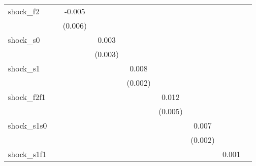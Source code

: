 {\begin{tabular}{l*{8}{c}}
\addlinespace
shock\_f2    &                     &      -0.005         &                     &                     &                     &                     &                     &                     \\
            &                     &     (0.006)         &                     &                     &                     &                     &                     &                     \\
\addlinespace
shock\_s0    &                     &                     &       0.003         &                     &                     &                     &                     &                     \\
            &                     &                     &     (0.003)         &                     &                     &                     &                     &                     \\
\addlinespace
shock\_s1    &                     &                     &                     &       0.008\sym{***}&                     &                     &                     &                     \\
            &                     &                     &                     &     (0.002)         &                     &                     &                     &                     \\
\addlinespace
shock\_f2f1  &                     &                     &                     &                     &       0.012\sym{**} &                     &                     &                     \\
            &                     &                     &                     &                     &     (0.005)         &                     &                     &                     \\
\addlinespace
shock\_s1s0  &                     &                     &                     &                     &                     &       0.007\sym{***}&                     &                     \\
            &                     &                     &                     &                     &                     &     (0.002)         &                     &                     \\
\addlinespace
shock\_s1f1  &                     &                     &                     &                     &                     &                     &       0.001         &                     \\

\end{tabular}}
